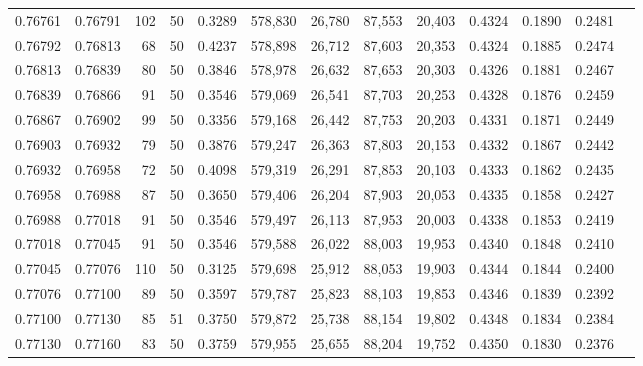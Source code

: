 \begin{tabular}{rrrrrrrrrrrrr}
0.76761 & 0.76791 &   102 &  50 &                                     0.3289 & 578,830 &  26,780 &  87,553 &  20,403 & 0.4324 & 0.1890 & 0.2481 \\
0.76792 & 0.76813 &    68 &  50 &                                     0.4237 & 578,898 &  26,712 &  87,603 &  20,353 & 0.4324 & 0.1885 & 0.2474 \\
0.76813 & 0.76839 &    80 &  50 &                                     0.3846 & 578,978 &  26,632 &  87,653 &  20,303 & 0.4326 & 0.1881 & 0.2467 \\
0.76839 & 0.76866 &    91 &  50 &                                     0.3546 & 579,069 &  26,541 &  87,703 &  20,253 & 0.4328 & 0.1876 & 0.2459 \\
0.76867 & 0.76902 &    99 &  50 &                                     0.3356 & 579,168 &  26,442 &  87,753 &  20,203 & 0.4331 & 0.1871 & 0.2449 \\
0.76903 & 0.76932 &    79 &  50 &                                     0.3876 & 579,247 &  26,363 &  87,803 &  20,153 & 0.4332 & 0.1867 & 0.2442 \\
0.76932 & 0.76958 &    72 &  50 &                                     0.4098 & 579,319 &  26,291 &  87,853 &  20,103 & 0.4333 & 0.1862 & 0.2435 \\
0.76958 & 0.76988 &    87 &  50 &                                     0.3650 & 579,406 &  26,204 &  87,903 &  20,053 & 0.4335 & 0.1858 & 0.2427 \\
0.76988 & 0.77018 &    91 &  50 &                                     0.3546 & 579,497 &  26,113 &  87,953 &  20,003 & 0.4338 & 0.1853 & 0.2419 \\
0.77018 & 0.77045 &    91 &  50 &                                     0.3546 & 579,588 &  26,022 &  88,003 &  19,953 & 0.4340 & 0.1848 & 0.2410 \\
0.77045 & 0.77076 &   110 &  50 &                                     0.3125 & 579,698 &  25,912 &  88,053 &  19,903 & 0.4344 & 0.1844 & 0.2400 \\
0.77076 & 0.77100 &    89 &  50 &                                     0.3597 & 579,787 &  25,823 &  88,103 &  19,853 & 0.4346 & 0.1839 & 0.2392 \\
0.77100 & 0.77130 &    85 &  51 &                                     0.3750 & 579,872 &  25,738 &  88,154 &  19,802 & 0.4348 & 0.1834 & 0.2384 \\
0.77130 & 0.77160 &    83 &  50 &                                     0.3759 & 579,955 &  25,655 &  88,204 &  19,752 & 0.4350 & 0.1830 & 0.2376 \\

\end{tabular}
